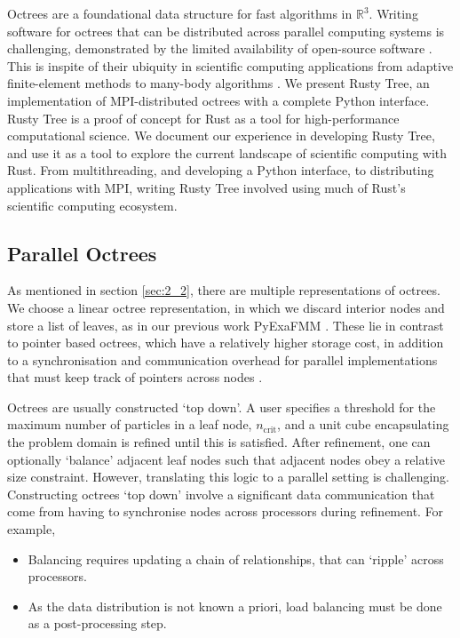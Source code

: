 Octrees are a foundational data structure for fast algorithms in $\mathbb{R}^3$. Writing software for octrees that can be distributed across parallel computing systems is challenging, demonstrated by the limited availability of open-source software \cite{BursteddeWilcoxGhattas11,fernando2020github}. This is inspite of their ubiquity in scientific computing applications from adaptive finite-element methods to many-body algorithms \cite{sundar2008bottom}. We present Rusty Tree, an implementation of MPI-distributed octrees with a complete Python interface. Rusty Tree is a proof of concept for Rust as a tool for high-performance computational science. We document our experience in developing Rusty Tree, and use it as a tool to explore the current landscape of scientific computing with Rust. From multithreading, and developing a Python interface, to distributing applications with MPI, writing Rusty Tree involved using much of Rust's scientific computing ecosystem. 

\subsection*{Parallel Octrees}

As mentioned in section \ref{sec:2_2}, there are multiple representations of octrees. We choose a linear octree representation, in which we discard interior nodes and store a list of leaves, as in our previous work PyExaFMM \cite{kailasa2022pyexafmm}. These lie in contrast to pointer based octrees, which have a relatively higher storage cost, in addition to a synchronisation and communication overhead for parallel implementations that must keep track of pointers across nodes \cite{tu2005scalable}. 

Octrees are usually constructed `top down'. A user specifies a threshold for the maximum number of particles in a leaf node, $n_{\text{crit}}$, and a unit cube encapsulating the problem domain is refined until this is satisfied. After refinement, one can optionally `balance' adjacent leaf nodes such that adjacent nodes obey a relative size constraint. However, translating this logic to a parallel setting is challenging. Constructing octrees `top down' involve a significant data communication that come from having to synchronise nodes across processors during refinement. For example,

\begin{itemize}
    \item Balancing requires updating a chain of relationships, that can `ripple' across processors.
    \item As the data distribution is not known a priori, load balancing must be done as a post-processing step.
\end{itemize}

